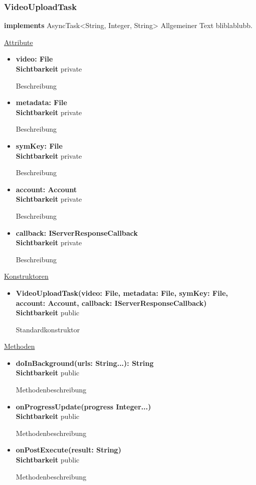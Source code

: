 \subsubsection{VideoUploadTask} \label{app:klasse:VideoUploadTask}
\textbf{implements} AsyncTask<String, Integer, String> \newline
Allgemeiner Text bliblablubb. \newline

\underline{Attribute}
\begin{itemize}
\itemsep0pt
\item \textbf{video: File} \hfill\\ 
\textbf{Sichtbarkeit} private

Beschreibung

\item \textbf{metadata: File} \hfill\\ 
\textbf{Sichtbarkeit} private

Beschreibung

\item \textbf{symKey: File} \hfill\\ 
\textbf{Sichtbarkeit} private

Beschreibung

\item \textbf{account: Account} \hfill\\ 
\textbf{Sichtbarkeit} private

Beschreibung

\item \textbf{callback: IServerResponseCallback} \hfill\\ 
\textbf{Sichtbarkeit} private

Beschreibung
\end{itemize}

\underline{Konstruktoren}
\begin{itemize}
\itemsep0pt
\item \textbf{VideoUploadTask(video: File, metadata: File, symKey: File, account: Account, callback: IServerResponseCallback)} \hfill\\
\textbf{Sichtbarkeit} public

Standardkonstruktor
\end{itemize}

\underline{Methoden}
\begin{itemize}
\itemsep0pt
\item \textbf{doInBackground(urls: String...): String}\hfill\\
\textbf{Sichtbarkeit} public

Methodenbeschreibung

\item \textbf{onProgressUpdate(progress Integer...)}\hfill\\
\textbf{Sichtbarkeit} public

Methodenbeschreibung

\item \textbf{onPostExecute(result: String)}\hfill\\
\textbf{Sichtbarkeit} public

Methodenbeschreibung
\end{itemize}